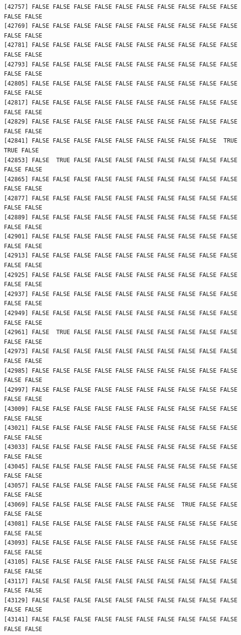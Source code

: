 \documentclass[
  a4paper,
  DIV=11,
  numbers=noendperiod]{scrartcl}
\begin{document}
\begin{verbatim}
[42757] FALSE FALSE FALSE FALSE FALSE FALSE FALSE FALSE FALSE FALSE FALSE FALSE
[42769] FALSE FALSE FALSE FALSE FALSE FALSE FALSE FALSE FALSE FALSE FALSE FALSE
[42781] FALSE FALSE FALSE FALSE FALSE FALSE FALSE FALSE FALSE FALSE FALSE FALSE
[42793] FALSE FALSE FALSE FALSE FALSE FALSE FALSE FALSE FALSE FALSE FALSE FALSE
[42805] FALSE FALSE FALSE FALSE FALSE FALSE FALSE FALSE FALSE FALSE FALSE FALSE
[42817] FALSE FALSE FALSE FALSE FALSE FALSE FALSE FALSE FALSE FALSE FALSE FALSE
[42829] FALSE FALSE FALSE FALSE FALSE FALSE FALSE FALSE FALSE FALSE FALSE FALSE
[42841] FALSE FALSE FALSE FALSE FALSE FALSE FALSE FALSE FALSE  TRUE  TRUE FALSE
[42853] FALSE  TRUE FALSE FALSE FALSE FALSE FALSE FALSE FALSE FALSE FALSE FALSE
[42865] FALSE FALSE FALSE FALSE FALSE FALSE FALSE FALSE FALSE FALSE FALSE FALSE
[42877] FALSE FALSE FALSE FALSE FALSE FALSE FALSE FALSE FALSE FALSE FALSE FALSE
[42889] FALSE FALSE FALSE FALSE FALSE FALSE FALSE FALSE FALSE FALSE FALSE FALSE
[42901] FALSE FALSE FALSE FALSE FALSE FALSE FALSE FALSE FALSE FALSE FALSE FALSE
[42913] FALSE FALSE FALSE FALSE FALSE FALSE FALSE FALSE FALSE FALSE FALSE FALSE
[42925] FALSE FALSE FALSE FALSE FALSE FALSE FALSE FALSE FALSE FALSE FALSE FALSE
[42937] FALSE FALSE FALSE FALSE FALSE FALSE FALSE FALSE FALSE FALSE FALSE FALSE
[42949] FALSE FALSE FALSE FALSE FALSE FALSE FALSE FALSE FALSE FALSE FALSE FALSE
[42961] FALSE  TRUE FALSE FALSE FALSE FALSE FALSE FALSE FALSE FALSE FALSE FALSE
[42973] FALSE FALSE FALSE FALSE FALSE FALSE FALSE FALSE FALSE FALSE FALSE FALSE
[42985] FALSE FALSE FALSE FALSE FALSE FALSE FALSE FALSE FALSE FALSE FALSE FALSE
[42997] FALSE FALSE FALSE FALSE FALSE FALSE FALSE FALSE FALSE FALSE FALSE FALSE
[43009] FALSE FALSE FALSE FALSE FALSE FALSE FALSE FALSE FALSE FALSE FALSE FALSE
[43021] FALSE FALSE FALSE FALSE FALSE FALSE FALSE FALSE FALSE FALSE FALSE FALSE
[43033] FALSE FALSE FALSE FALSE FALSE FALSE FALSE FALSE FALSE FALSE FALSE FALSE
[43045] FALSE FALSE FALSE FALSE FALSE FALSE FALSE FALSE FALSE FALSE FALSE FALSE
[43057] FALSE FALSE FALSE FALSE FALSE FALSE FALSE FALSE FALSE FALSE FALSE FALSE
[43069] FALSE FALSE FALSE FALSE FALSE FALSE FALSE  TRUE FALSE FALSE FALSE FALSE
[43081] FALSE FALSE FALSE FALSE FALSE FALSE FALSE FALSE FALSE FALSE FALSE FALSE
[43093] FALSE FALSE FALSE FALSE FALSE FALSE FALSE FALSE FALSE FALSE FALSE FALSE
[43105] FALSE FALSE FALSE FALSE FALSE FALSE FALSE FALSE FALSE FALSE FALSE FALSE
[43117] FALSE FALSE FALSE FALSE FALSE FALSE FALSE FALSE FALSE FALSE FALSE FALSE
[43129] FALSE FALSE FALSE FALSE FALSE FALSE FALSE FALSE FALSE FALSE FALSE FALSE
[43141] FALSE FALSE FALSE FALSE FALSE FALSE FALSE FALSE FALSE FALSE FALSE FALSE

\end{verbatim}
\end{document}

